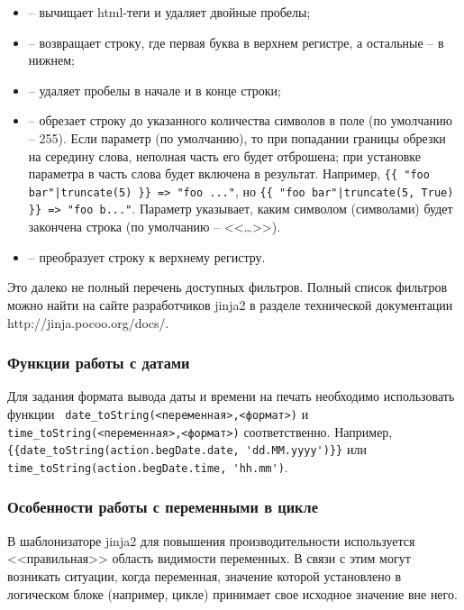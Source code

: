\begin{itemize}
 \item {} – вычищает html-теги и удаляет двойные пробелы;
 \item {} – возвращает строку, где первая буква в верхнем регистре, а остальные – в нижнем;
 \item {} – удаляет пробелы в начале и в конце строки;
 \item {} – обрезает строку до указанного количества символов в поле  (по умолчанию – 255). Если параметр  (по умолчанию), то при попадании границы обрезки на середину слова, неполная часть его будет отброшена; при установке параметра в  часть слова будет включена в результат. Например, \verb/{{ "foo bar"|truncate(5) }} => "foo ..."/, но \verb/{{ "foo bar"|truncate(5, True) }} => "foo b..."/. Параметр  указывает, каким символом (символами) будет закончена строка (по умолчанию – <<…>>).
 \item {} – преобразует строку к верхнему регистру.
\end{itemize}
 
Это далеко не полный перечень доступных фильтров. Полный список фильтров можно найти на сайте разработчиков jinja2 в разделе технической документации http://jinja.pocoo.org/docs/.

\subsubsection{Функции работы с датами}

Для задания формата вывода даты и времени на печать необходимо использовать функции \verb| date_toString(<переменная>,<формат>)| и \verb|time_toString(<переменная>,<формат>)| соответственно. Например, \\ \verb|{{date_toString(action.begDate.date, 'dd.MM.yyyy')}}| или \verb|time_toString(action.begDate.time, 'hh.mm')|.

\subsubsection{Особенности работы с переменными в цикле}

В шаблонизаторе jinja2 для повышения производительности используется <<правильная>> область видимости переменных. В связи с этим могут возникать ситуации, когда переменная, значение которой установлено в логическом блоке (например, цикле) принимает свое исходное значение вне него.

